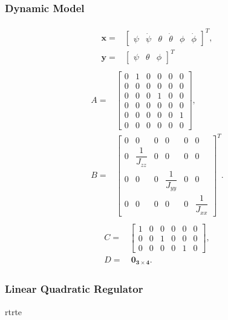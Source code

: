 \subsubsection{Dynamic Model}
\begin{align}
\begin{split}
\mathbf{x} = & \begin{bmatrix}
\psi & \dot{\psi} & \theta & \dot{\theta} & \phi & \dot{\phi}
\end{bmatrix}^{T},\\[15px]
\mathbf{y} = & \begin{bmatrix}
\psi & \theta & \phi
\end{bmatrix}^{T}
\end{split}
\end{align}
\begin{align}
\begin{split}
A = & 
\begin{bmatrix}
0 & 1 & 0 & 0 & 0 & 0 \\[2px]
0 & 0 & 0 & 0 & 0 & 0 \\[2px]
0 & 0 & 0 & 1 & 0 & 0 \\[2px]
0 & 0 & 0 & 0 & 0 & 0 \\[2px]
0 & 0 & 0 & 0 & 0 & 1 \\[2px]
0 & 0 & 0 & 0 & 0 & 0
\end{bmatrix}, \\[15px]
B = & 
\begin{bmatrix}
0 & 0 & 0 & 0 & 0 & 0\\[5px]
0 & \dfrac{1}{J_{zz}} & 0 & 0 & 0 & 0\\[5px]
0 & 0 & 0 & \dfrac{1}{J_{yy}} & 0 & 0\\[5px]
0 & 0 & 0 & 0 & 0 & \dfrac{1}{J_{xx}}
\end{bmatrix}^{T}.
\end{split}
\end{align}
\begin{align}
\begin{split}
C = & 
\begin{bmatrix}
1 & 0 & 0 & 0 & 0 & 0 \\[2px]
0 & 0 & 1 & 0 & 0 & 0 \\[2px]
0 & 0 & 0 & 0 & 1 & 0
\end{bmatrix}, \\[15px]
D = &\ \mathbf{0_{3\times 4}}.
\end{split}
\end{align}
\subsubsection{Linear Quadratic Regulator}
rtrte

